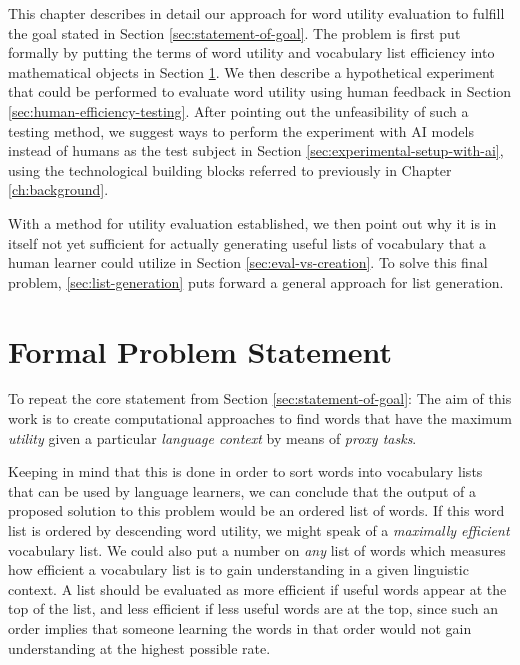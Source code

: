 This chapter describes in detail our approach for word utility evaluation to fulfill the goal stated in Section \ref{sec:statement-of-goal}.
The problem is first put formally by putting the terms of word utility and vocabulary list efficiency into mathematical objects in Section \ref{sec:formal-problem-statement}.
We then describe a hypothetical experiment that could be performed to evaluate word utility using human feedback in Section \ref{sec:human-efficiency-testing}.
After pointing out the unfeasibility of such a testing method, we suggest ways to perform the experiment with AI models instead of humans as the test subject in Section \ref{sec:experimental-setup-with-ai}, using the technological building blocks referred to previously in Chapter \ref{ch:background}.

With a method for utility evaluation established, we then point out why it is in itself not yet sufficient for actually generating useful lists of vocabulary that a human learner could utilize in Section \ref{sec:eval-vs-creation}.
To solve this final problem, \ref{sec:list-generation} puts forward a general approach for list generation.

\section{Formal Problem Statement} \label{sec:formal-problem-statement}


To repeat the core statement from Section \ref{sec:statement-of-goal}:
The aim of this work is to create computational approaches to find words that have the maximum \textit{utility} given a particular \textit{language context} by means of \textit{proxy tasks}.

Keeping in mind that this is done in order to sort words into vocabulary lists that can be used by language learners, we can conclude that the output of a proposed solution to this problem would be an ordered list of words.
If this word list is ordered by descending word utility, we might speak of a \textit{maximally efficient} vocabulary list.
We could also put a number on \textit{any} list of words which measures how efficient a vocabulary list is to gain understanding in a given linguistic context.
A list should be evaluated as more efficient if useful words appear at the top of the list, and less efficient if less useful words are at the top, since such an order implies that someone learning the words in that order would not gain understanding at the highest possible rate.

